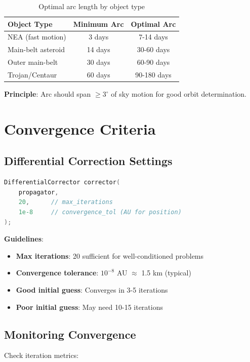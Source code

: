 \begin{table}[h]
\centering
\caption{Optimal arc length by object type}
\begin{tabular}{lcc}
\hline
\textbf{Object Type} & \textbf{Minimum Arc} & \textbf{Optimal Arc} \\
\hline
NEA (fast motion) & 3 days & 7-14 days \\
Main-belt asteroid & 14 days & 30-60 days \\
Outer main-belt & 30 days & 60-90 days \\
Trojan/Centaur & 60 days & 90-180 days \\
\hline
\end{tabular}
\end{table}

\textbf{Principle}: Arc should span $\geq 3^\circ$ of sky motion for good orbit determination.

\section{Convergence Criteria}

\subsection{Differential Correction Settings}

\begin{lstlisting}[language=C++]
DifferentialCorrector corrector(
    propagator,
    20,      // max_iterations
    1e-8     // convergence_tol (AU for position)
);
\end{lstlisting}

\textbf{Guidelines}:
\begin{itemize}
    \item \textbf{Max iterations}: 20 sufficient for well-conditioned problems
    \item \textbf{Convergence tolerance}: $10^{-8}$ AU $\approx$ 1.5 km (typical)
    \item \textbf{Good initial guess}: Converges in 3-5 iterations
    \item \textbf{Poor initial guess}: May need 10-15 iterations
\end{itemize}

\subsection{Monitoring Convergence}

Check iteration metrics:

